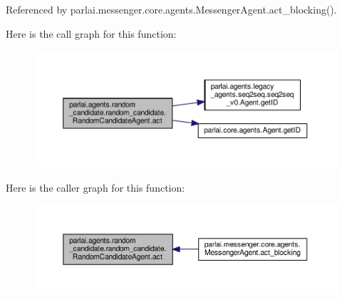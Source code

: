 Referenced by parlai.\+messenger.\+core.\+agents.\+Messenger\+Agent.\+act\+\_\+blocking().

Here is the call graph for this function\+:
\nopagebreak
\begin{figure}[H]
\begin{center}
\leavevmode
\includegraphics[width=350pt]{classparlai_1_1agents_1_1random__candidate_1_1random__candidate_1_1RandomCandidateAgent_acb0a6e3c223f9e784a668d24b3e7fc82_cgraph}
\end{center}
\end{figure}
Here is the caller graph for this function\+:
\nopagebreak
\begin{figure}[H]
\begin{center}
\leavevmode
\includegraphics[width=350pt]{classparlai_1_1agents_1_1random__candidate_1_1random__candidate_1_1RandomCandidateAgent_acb0a6e3c223f9e784a668d24b3e7fc82_icgraph}
\end{center}
\end{figure}
\mbox{\label{classparlai_1_1agents_1_1random__candidate_1_1random__candidate_1_1RandomCandidateAgent_adf32b766729393efc5fbdffee363f75a}} 
